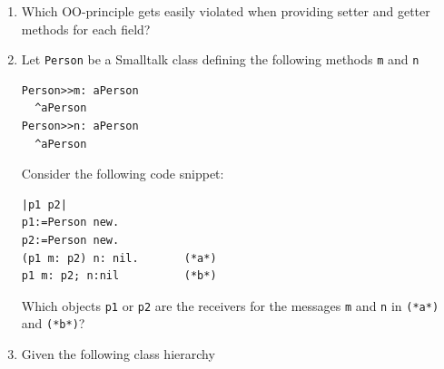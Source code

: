 \documentclass{article}
\newcommand{\comment}[1]{\marginpar{#1}}
\begin{document}
\begin{enumerate}
\item Which OO-principle gets easily violated when providing setter
  and getter methods for each field?  \comment{\textbf{1 point}}
\item Let \texttt{Person} be a Smalltalk class defining the following
  methods \texttt{m} and \texttt{n}
\begin{lstlisting}[basicstyle=\small]
Person>>m: aPerson	
  ^aPerson
Person>>n: aPerson	
  ^aPerson
\end{lstlisting}
Consider the following code snippet:
\begin{lstlisting}[basicstyle=\small]
|p1 p2| 
p1:=Person new.
p2:=Person new.
(p1 m: p2) n: nil.       (*a*) 
p1 m: p2; n:nil          (*b*)
\end{lstlisting}
Which objects \lstinline!p1! or \lstinline!p2! are the receivers for the
messages \lstinline!m! and \lstinline!n! in \lstinline!(*a*)! and
\lstinline!(*b*)!?  \comment{\textbf{2 points}}

\item Given the following class
  hierarchy \\
\begin{center}

\end{center}
\end{enumerate}
\end{document}
